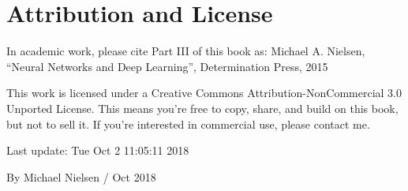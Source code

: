 \section*{Attribution and License}

In academic work, please cite Part III of this book \cite{Nielsen2015} as: Michael A. Nielsen, ``Neural Networks and Deep Learning'', Determination Press, 2015 

This work is licensed under a Creative Commons Attribution-NonCommercial 3.0 Unported License. This means you're free to copy, share, and build on this book, but not to sell it. If you're interested in commercial use, please contact me. 

Last update: Tue Oct 2 11:05:11 2018 

By Michael Nielsen / Oct 2018 

